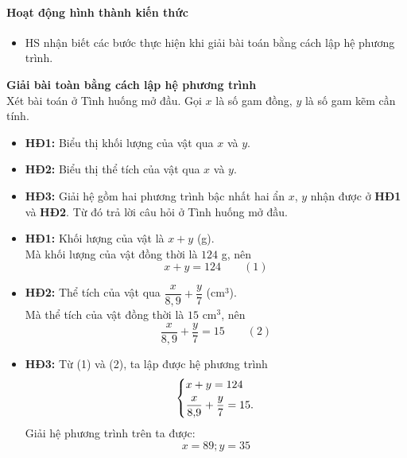 \paragraph{Hoạt động hình thành kiến thức}

\muctieu

\begin{itemize}
	\item HS nhận biết các bước thực hiện khi giải bài toán bằng cách lập hệ phương trình.
\end{itemize}

\noidungsanpham

\begin{ttkp}
	\textbf{Giải bài toàn bằng cách lập hệ phương trình}\\
	Xét bài toán ở Tình huống mở đầu. Gọi $x$ là số gam đồng, $y$ là số gam kẽm cần tính.
	\begin{itemize}
		\item[] \textbf{HĐ1:} Biểu thị khối lượng của vật qua $x$ và $y$.
		\item[] \textbf{HĐ2:} Biểu thị thể tích của vật qua $x$ và $y$.
		\item[] \textbf{HĐ3:} Giải hệ gồm hai phương trình bậc nhất hai ẩn $x$, $y$ nhận được ở \textbf{HĐ1} và \textbf{HĐ2}. Từ đó trả lời câu hỏi ở Tình huống mở đầu.
	\end{itemize}
	\doicot
	\huongdan
	\begin{itemize}
		\item[] \textbf{HĐ1:} Khối lượng của vật là $x+y$ (g).\\
		Mà khối lượng của vật đồng thời là $124$ g, nên 
		$$x+y=124\qquad(1)$$
		\item[] \textbf{HĐ2:} Thể tích của vật qua $\dfrac{x}{8{,}9}+\dfrac{y}{7}$ (cm$^3$).\\
		Mà thể tích của vật đồng thời là $15$ cm$^3$, nên 
		$$\dfrac{x}{8{,}9}+\dfrac{y}{7}=15\qquad(2)$$
		\item[] \textbf{HĐ3:} Từ (1) và (2), ta lập được hệ phương trình
		$$\left\{\begin{aligned}&x+y=124\\&\dfrac{x}{8{,}9}+\dfrac{y}{7}=15.\end{aligned}\right.$$
		Giải hệ phương trình trên ta được:
		$$x=89;y=35$$
	\end{itemize}
\end{ttkp}

